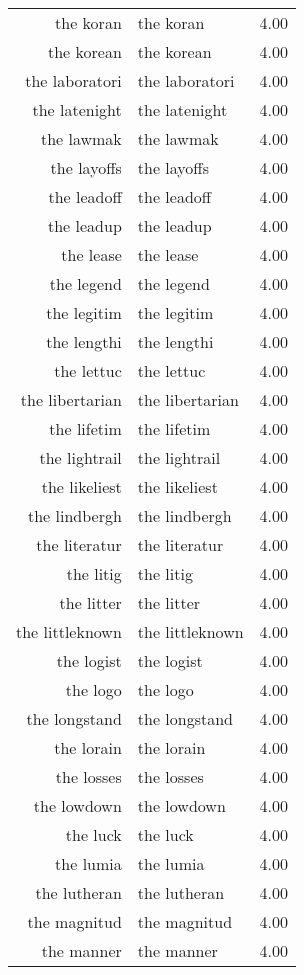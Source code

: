 \begin{table}[ht]
\begin{tabular}{rlr}
  the koran & the koran & 4.00 \\ 
  the korean & the korean & 4.00 \\ 
  the laboratori & the laboratori & 4.00 \\ 
  the latenight & the latenight & 4.00 \\ 
  the lawmak & the lawmak & 4.00 \\ 
  the layoffs & the layoffs & 4.00 \\ 
  the leadoff & the leadoff & 4.00 \\ 
  the leadup & the leadup & 4.00 \\ 
  the lease & the lease & 4.00 \\ 
  the legend & the legend & 4.00 \\ 
  the legitim & the legitim & 4.00 \\ 
  the lengthi & the lengthi & 4.00 \\ 
  the lettuc & the lettuc & 4.00 \\ 
  the libertarian & the libertarian & 4.00 \\ 
  the lifetim & the lifetim & 4.00 \\ 
  the lightrail & the lightrail & 4.00 \\ 
  the likeliest & the likeliest & 4.00 \\ 
  the lindbergh & the lindbergh & 4.00 \\ 
  the literatur & the literatur & 4.00 \\ 
  the litig & the litig & 4.00 \\ 
  the litter & the litter & 4.00 \\ 
  the littleknown & the littleknown & 4.00 \\ 
  the logist & the logist & 4.00 \\ 
  the logo & the logo & 4.00 \\ 
  the longstand & the longstand & 4.00 \\ 
  the lorain & the lorain & 4.00 \\ 
  the losses & the losses & 4.00 \\ 
  the lowdown & the lowdown & 4.00 \\ 
  the luck & the luck & 4.00 \\ 
  the lumia & the lumia & 4.00 \\ 
  the lutheran & the lutheran & 4.00 \\ 
  the magnitud & the magnitud & 4.00 \\ 
  the manner & the manner & 4.00 \\ 

\end{tabular}
\end{table}
